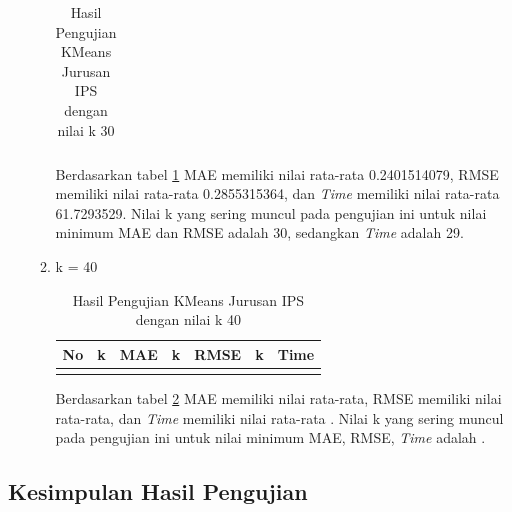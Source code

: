 \begin{enumerate}
\begin{enumerate}
\begin{longtable}[H]{|c|c|c|c|c|c|c|}
                        
                        \caption{Hasil Pengujian KMeans Jurusan IPS dengan nilai k 30}
                        \label{tab:ips k = 30}
                    \end{longtable}
                \endgroup
                
                Berdasarkan tabel \ref{tab:ips k = 30} MAE memiliki nilai rata-rata 0.2401514079, RMSE memiliki nilai rata-rata 0.2855315364, dan \textit{Time} memiliki nilai rata-rata 61.7293529. Nilai k yang sering muncul pada pengujian ini untuk nilai minimum MAE dan RMSE adalah 30, sedangkan \textit{Time} adalah 29.
                
            \item k = 40 \\
                \begingroup
                \renewcommand\arraystretch{1.5}
                    \begin{longtable}[H]{|c|c|c|c|c|c|c|}
                        \hline
                        No & k & MAE & k & RMSE & k & Time \\
                        \hline
                        
                        
                        \caption{Hasil Pengujian KMeans Jurusan IPS dengan nilai k 40}
                        \label{tab:ips k = 40}
                    \end{longtable}
                \endgroup
                
                Berdasarkan tabel \ref{tab:ips k = 40} MAE memiliki nilai rata-rata, RMSE memiliki nilai rata-rata, dan \textit{Time} memiliki nilai rata-rata . Nilai k yang sering muncul pada pengujian ini untuk nilai minimum MAE, RMSE, \textit{Time} adalah .
        \end{enumerate}
\end{enumerate}


\subsection{Kesimpulan Hasil Pengujian}
\label{subsec:kesimpulan hasil pengujian}

